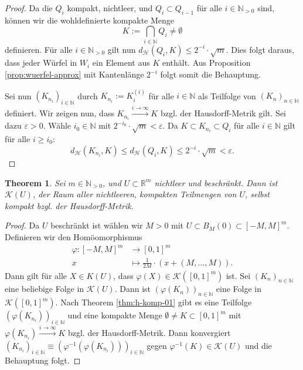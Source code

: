 \documentclass[a4paper,12pt]{article}
\theoremstyle{definition}
\theoremstyle{plain}
\newtheorem{theorem}{Theorem}
\def\H{\mathcal{H}}
\def\N{\mathbb{N}}
\def\R{\mathbb{R}}
\def\K{\mathcal{K}}
\begin{document}
\begin{proof}
  Da die $Q_i$ kompakt, nichtleer, und $Q_i \subset Q_{i-1}$ für alle $i \in \N_{>0}$ sind, können wir die wohldefinierte kompakte Menge
  \[
    K := \bigcap_{i \in \N} Q_i \neq \emptyset
  \]
  definieren. Für alle $i \in \N_{>0}$ gilt nun $d_\H(Q_i, K) \leq 2^{-i} \cdot \sqrt{m}$. Dies folgt daraus, dass jeder Würfel in $W_i$ ein Element aus $K$ enthält. Aus Proposition \ref{prop:wuerfel-approx} mit Kantenlänge $2^{-i}$ folgt somit die Behauptung.
  
  Sei nun $(K_{n_i})_{i \in \N}$ durch $K_{n_i} := K_i^{(i)}$ für alle $i \in \N$ als Teilfolge von $(K_n)_{n \in \N}$ definiert. Wir zeigen nun, dass $K_{n_i} \xrightarrow{i \to \infty} K$ bzgl. der Hausdorff-Metrik gilt.
  Sei dazu $\varepsilon > 0$. Wähle $i_0 \in \N$ mit $2^{-i_0} \cdot \sqrt{m} < \varepsilon$. Da $K \subset K_{n_i} \subset Q_i$ für alle $i \in \N$ gilt für alle $i \geq i_0$:
  \[
    d_\H(K_{n_i}, K) \leq d_\H(Q_i, K) \leq 2^{-i} \cdot \sqrt{m} < \varepsilon.
  \]
\end{proof}

\begin{theorem}
  Sei $m \in \N_{>0}$, und $U \subset \R^m$ nichtleer und beschränkt. Dann ist $\K(U)$, der Raum aller nichtleeren, kompakten Teilmengen von $U$, selbst kompakt bzgl. der Hausdorff-Metrik.
\end{theorem}
\begin{proof}
  Da $U$ beschränkt ist wählen wir $M > 0$ mit $U \subset B_M(0) \subset [-M, M]^m$. Definieren wir den Homöomorphismus
  \begin{align*}
    \varphi : [-M, M]^m &\to [0,1]^m \\
    x &\mapsto \frac{1}{2M} \cdot (x + (M, \ldots, M)).
  \end{align*}
  Dann gilt für alle $X \in K(U)$, dass $\varphi(X) \in \K([0,1]^m)$ ist. Sei $(K_n)_{n \in \N}$ eine beliebige Folge in $\K(U)$. Dann ist $(\varphi(K_n))_{n \in \N}$ eine Folge in $\K([0,1]^m)$. Nach Theorem \ref{thm:h-komp-01} gibt es eine Teilfolge $(\varphi(K_{n_i}))_{i \in \N}$ und eine kompakte Menge $\emptyset \neq K \subset [0,1]^m$ mit $\varphi(K_{n_i}) \xrightarrow{i \to \infty} K$ bzgl. der Hausdorff-Metrik. Dann konvergiert $(K_{n_i})_{i \in \N} \equiv (\varphi^{-1}(\varphi(K_{n_i})))_{i \in \N}$ gegen $\varphi^{-1}(K) \in \K(U)$ und die Behauptung folgt.
\end{proof}
\end{document}
